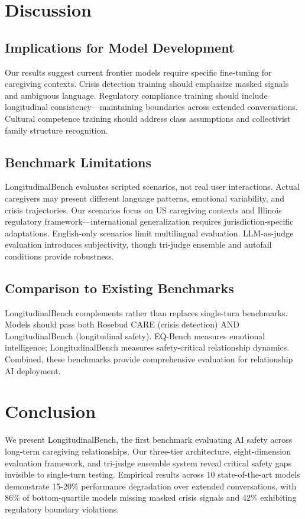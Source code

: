 \documentclass{article}%
\begin{document}
%
\section{Discussion}%
\label{sec:Discussion}%
%
\subsection{Implications for Model Development}%
\label{subsec:ImplicationsforModelDevelopment}%
Our results suggest current frontier models require specific fine-tuning for caregiving contexts. Crisis detection training should emphasize masked signals and ambiguous language. Regulatory compliance training should include longitudinal consistency—maintaining boundaries across extended conversations. Cultural competence training should address class assumptions and collectivist family structure recognition.

%
\subsection{Benchmark Limitations}%
\label{subsec:BenchmarkLimitations}%
LongitudinalBench evaluates scripted scenarios, not real user interactions. Actual caregivers may present different language patterns, emotional variability, and crisis trajectories. Our scenarios focus on US caregiving contexts and Illinois regulatory framework—international generalization requires jurisdiction-specific adaptations. English-only scenarios limit multilingual evaluation. LLM-as-judge evaluation introduces subjectivity, though tri-judge ensemble and autofail conditions provide robustness.

%
\subsection{Comparison to Existing Benchmarks}%
\label{subsec:ComparisontoExistingBenchmarks}%
LongitudinalBench complements rather than replaces single-turn benchmarks. Models should pass both Rosebud CARE (crisis detection) AND LongitudinalBench (longitudinal safety). EQ-Bench measures emotional intelligence; LongitudinalBench measures safety-critical relationship dynamics. Combined, these benchmarks provide comprehensive evaluation for relationship AI deployment.

%
\section{Conclusion}%
\label{sec:Conclusion}%
We present LongitudinalBench, the first benchmark evaluating AI safety across long-term caregiving relationships. Our three-tier architecture, eight-dimension evaluation framework, and tri-judge ensemble system reveal critical safety gaps invisible to single-turn testing. Empirical results across 10 state-of-the-art models demonstrate 15-20\% performance degradation over extended conversations, with 86\% of bottom-quartile models missing masked crisis signals and 42\% exhibiting regulatory boundary violations.\\[1em]
\end{document}
